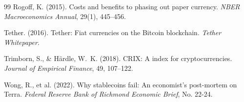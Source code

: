 \documentclass[11pt,a4paper]{article}
\begin{document}
\begin{thebibliography}{99}
Rogoff, K. (2015).
\newblock Costs and benefits to phasing out paper currency.
\newblock \textit{NBER Macroeconomics Annual}, 29(1), 445--456.

Tether. (2016).
\newblock Tether: Fiat currencies on the Bitcoin blockchain.
\newblock \textit{Tether Whitepaper}.

Trimborn, S., \& H{\"a}rdle, W.~K. (2018).
\newblock CRIX: A index for cryptocurrencies.
\newblock \textit{Journal of Empirical Finance}, 49, 107--122.

Wong, R., et al. (2022).
\newblock Why stablecoins fail: An economist's post-mortem on Terra.
\newblock \textit{Federal Reserve Bank of Richmond Economic Brief}, No. 22-24.

\end{thebibliography}
\end{document}
